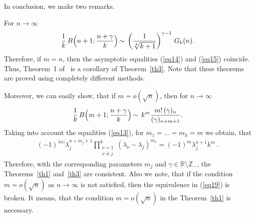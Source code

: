 \documentclass[
11pt,%
tightenlines,%
twoside,%
onecolumn,%
nofloats,%
nobibnotes,%
nofootinbib,%
superscriptaddress,%
noshowpacs,%
centertags]%
{revtex4}
\begin{document}
In conclusion, we make two remarks.

For $n\rightarrow\infty$
\begin{eqnarray*}
\frac{1}{k}\,B\Bigl(n+1;\frac{n+\gamma}{k}\Bigl)\,\sim\,
\left(\frac{1}{\sqrt[k]{k+1}}\right)^{\gamma-1}\,G_k(n).
\end{eqnarray*}
Therefore, if $m=n$, then the asymptotic equalities (\ref{eq14})
and (\ref{eq15}) coincide. Thus, Theorem~1 of~\cite{Star1}
is a corollary of Theorem~\ref{th3}. Note that these theorems
are proved using completely different methods.

Moreover, we can easily show, that if $m=o(\sqrt{n})$,
then for $n\rightarrow\infty$
\begin{eqnarray}\label{eq19}
\frac{1}{k}\,B\Bigl(m+1;\frac{n+\gamma}{k}\Bigl)\,\sim\,
k^m\frac{m!\,(\gamma)_n}{(\gamma)_{n+m+1}}.
\end{eqnarray}
Taking into account the equalities (\ref{eq13}), for $m_1=\ldots=m_k=m$ we obtain, that
\begin{eqnarray*}
(-1)^{|m|}\lambda_j^{n+m_j+1}\prod^{k}_{\substack{
        \nu=1 \\
        \nu\neq j
}} (\lambda_{\nu}-\lambda_j)^{m_{\nu}}=(-1)^m\lambda_j^{n+1}k^m\,.
\end{eqnarray*}
Therefore, with the corresponding parameters $m_j$ and
$\gamma\in\mathbb{R}\setminus \mathbb{Z_{-}}$, the Theorems~\ref{th1}
and~\ref{th3} are consistent. Also we  note, that if the condition
$m=o(\sqrt{n})$ as $n\rightarrow\infty$ is not satisfied, then
the equivalence in (\ref{eq19}) is broken. It means, that
the condition $m=o(\sqrt{n})$ in the Theorem~\ref{th1} is necessary.
\end{document}
